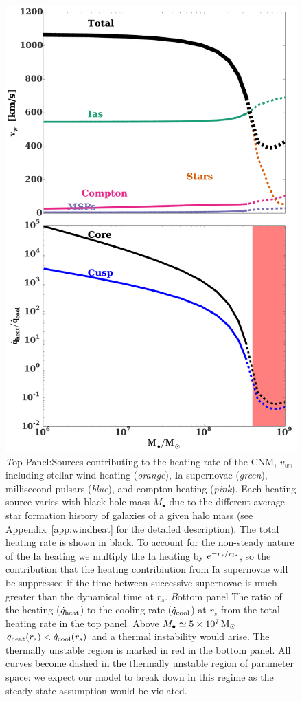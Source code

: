 \documentclass[usenatbib,fleqn]{mn2e}
\newcommand{\rs}{r_s}
\newcommand{\Mbh}[1][]{M_{\bullet#1}}
\newcommand{\rIa}{r_{\rm Ia}}
\newcommand{\vwO}{v_{w}}
\begin{document}
\begin{figure}
\includegraphics[width=\columnwidth]{vwSources.pdf}
\caption{\label{fig:vwSources} {\emph Top Panel:}Sources contributing
  to the heating rate of the CNM, $\vwO$, including stellar wind
  heating ({\it orange}), Ia supernovae ({\it green}), millisecond
  pulsars ({\it blue}), and compton heating ({\it pink}).  Each heating
  source varies with black hole mass $\Mbh$ due to the different
  average star formation history of galaxies of a given halo mass (see
  Appendix~\ref{app:windheat} for the detailed description). The total
  heating rate is shown in black. To account for the non-steady nature
  of the Ia heating we multiply the Ia heating by $e^{-\rs/\rIa}$, so
  the contribution that the heating contribiution from Ia supernovae
  will be suppressed if the time between successive supernovae is much
  greater than the dynamical time at $\rs$. {\emph Bottom panel} The
  ratio of the heating ($\dot{q}_{\rm heat}$) to the cooling rate
  ($\dot{q}_{\rm cool}$) at $\rs$ from the total heating rate in the
  top panel. Above $\Mbh\simeq 5\times 10^7 \Msun$ $\dot{q}_{\rm
    heat}(\rs)<\dot{q}_{\rm cool}(\rs)$ and a thermal instability
  would arise. The thermally unstable region is marked in red in the
  bottom panel. All curves become dashed in the thermally unstable
  region of parameter space: we expect our model to break down in this
  regime as the steady-state assumption would be violated.}
\end{figure}
\end{document}
